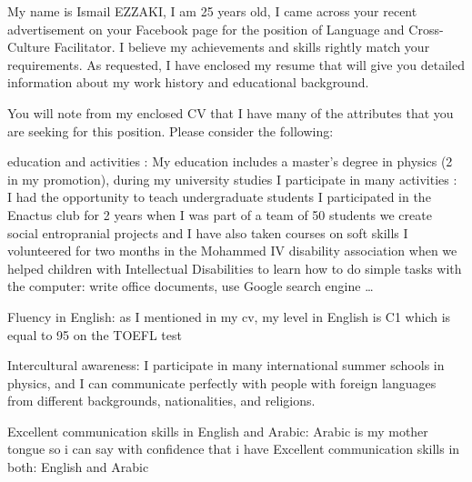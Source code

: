\documentclass[11pt, a4paper]{awesome-cv}
\begin{document}
	
	
	
	


	
	
	
	\begin{cvletter}
		
				\makelettertitle
My name is Ismail EZZAKI, I am 25 years old, I came across your recent advertisement on your Facebook page for the position of Language and Cross-Culture Facilitator. I believe my achievements and skills rightly match your requirements. As requested, I have enclosed my resume that will give you detailed information about my work history and educational background.

You will note from my enclosed CV that I have many of the attributes that you are seeking for this position. Please consider the following:

education and activities :
My education includes a master’s degree  in physics (2 in my promotion), during my university studies I participate in many activities :
I had the opportunity to teach undergraduate students  
I participated in the Enactus club for 2 years  when I was part  of a team of 50 students we create social entropranial projects 
and I have also taken courses on soft skills
I volunteered for two months in the Mohammed IV disability association when we helped children with Intellectual Disabilities to learn how to do simple tasks with the computer: write office documents, use Google search engine … 

Fluency in English:  as I mentioned in my cv, my level in English is C1 which is equal to 95 on the TOEFL test 

Intercultural awareness: I participate in many international summer schools in physics, and I can communicate perfectly with people with foreign languages from different backgrounds, nationalities, and religions.

Excellent communication skills in English and Arabic: Arabic is my mother tongue so i can say with confidence that i have Excellent communication skills in both: English and Arabic 


\end{cvletter}
\end{document}
